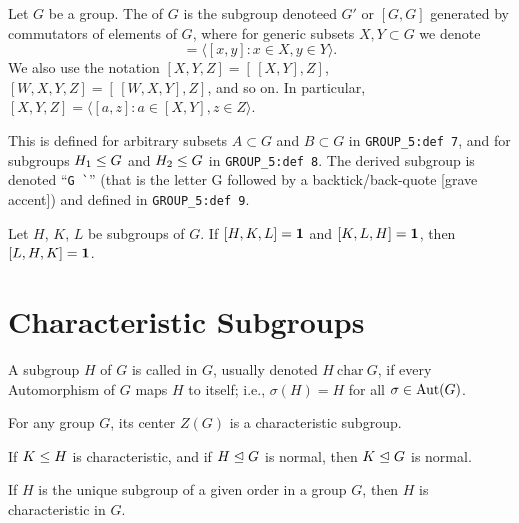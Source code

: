 \begin{definition}
Let $G$ be a group. The  of $G$ is the subgroup
denoteed $G'$ or $[G,G]$ generated by commutators of elements of $G$, where
for generic subsets $X,Y\subset G$ we denote
\begin{equation}
  [X,Y] = \langle [x,y] : x\in X,y\in Y\rangle.
\end{equation}
We also use the notation $[X,Y,Z] = [\,{[X,Y]},Z]$, $[W,X,Y,Z] = [\,{[W,X,Y]},Z]$,
and so on. In particular, $[X,Y,Z] = \langle [a,z] : a\in[X,Y], z\in Z\rangle$.
\end{definition}

\begin{remark}
This is defined for arbitrary subsets $A\subset G$ and $B\subset G$ in
\verb#GROUP_5:def 7#, and for subgroups $H_{1}\leq G$ and
$H_{2}\leq G$ in \verb#GROUP_5:def 8#. The derived subgroup is
denoted ``\verb#G `#'' (that is the letter G followed by a
backtick/back-quote [grave accent]) and defined in \verb#GROUP_5:def 9#.
\end{remark}


\begin{theorem}
  Let $H$, $K$, $L$ be subgroups of $G$.
  If $[H,K,L]=\mathbf{1}$ and $[K,L,H]=\mathbf{1}$,
  then $[L,H,K]=\mathbf{1}$.
\end{theorem}

\section{Characteristic Subgroups}

\begin{definition}
A subgroup $H$ of $G$ is called  in $G$, usually
denoted $H~\mathrm{char}~G$, if every Automorphism of $G$ maps $H$ to
itself; i.e., $\sigma(H)=H$ for all $\sigma\in\operatorname{Aut}(G)$.
\end{definition}

\begin{theorem}
For any group $G$, its center $Z(G)$ is a characteristic subgroup.
\end{theorem}

\begin{theorem}
If $K\leq H$ is characteristic, and if $H\trianglelefteq G$ is normal,
then $K\trianglelefteq G$ is normal.
\end{theorem}

\begin{theorem}
  If $H$ is the unique subgroup of a given order in a group $G$,
  then $H$ is characteristic in $G$.
\end{theorem}

